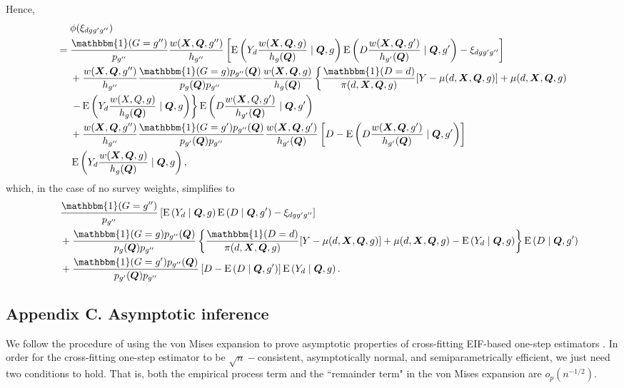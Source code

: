 \documentclass[12pt,a4paper]{article}
\newcommand{\E}{\operatorname{E}}
\def\X{{\boldsymbol X}}
\def\Q{{\boldsymbol Q}}
\def\one{\mathbbm{1}}
\begin{document}
Hence,
\begin{align*}
    &\phantom{{}={}} \phi(\xi_{dgg'g''}) \\
    &= \frac{\one(G=g'')}{p_{g''}}\frac{w(\X,\Q,g'')}{h_{g''}} \left[ \E \left(Y_d \frac{w(\X,\Q,g)}{h_{g}(\Q)}  \mid \Q, g \right) \E \left(D \frac{w(\X,\Q,g')}{h_{g'}(\Q)} \mid \Q, g' \right) - \xi_{dgg'g''} \right] \\
    &\phantom{{}={}} + \frac{w(\X,\Q,g'')}{h_{g''}}  \frac{\one(G=g) p_{g''}(\Q)}{p_g(\Q)p_{g''}} \frac{w(\X,\Q,g)}{h_g(\Q)} \left\{ \frac{\one(D=d)}{\pi(d,\X,\Q,g)} [Y-\mu(d,\X,\Q,g)]+\mu(d,\X,\Q,g) \right. \\
    &\phantom{{}={}} \left. - \E \left(Y_d \frac{w(X,Q,g)}{h_g(\Q)} \mid \Q,g \right) \right\} \E \left(D \frac{w(\X,Q,g')}{h_{g'}(\Q)} \mid \Q,g' \right) \\
    &\phantom{{}={}} + \frac{w(\X,\Q,g'')}{h_{g''}}  \frac{\one(G=g')p_{g''}(\Q)}{p_{g'}(\Q)p_{g''}} \frac{w(\X,\Q,g')}{h_{g'}(\Q)} \left[ D-\E \left(D \frac{w(\X,\Q,g')}{h_{g'}(\Q)} \mid \Q, g' \right) \right] \\
    &\phantom{{}={}} \E\left( Y_d \frac{w(\X,\Q,g)}{h_g(\Q)} \mid \Q, g \right), 
\end{align*}
which, in the case of no survey weights, simplifies to 
\begin{align*}
    &\phantom{{}={}} \frac{\one(G=g'')}{p_{g''}} \left[ \E \left(Y_d \mid \Q, g \right) \E \left(D \mid \Q, g' \right) - \xi_{dgg'g''} \right] \\
    &\phantom{{}={}} + \frac{\one(G=g) p_{g''}(\Q)}{p_g(\Q)p_{g''}} \left\{ \frac{\one(D=d)}{\pi(d,\X,\Q,g)} [Y-\mu(d,\X,\Q,g)]+\mu(d,\X,\Q,g) - \E \left(Y_d \mid \Q,g \right) \right\} \E \left(D \mid \Q,g' \right) \\
    &\phantom{{}={}} + \frac{\one(G=g')p_{g''}(\Q)}{p_{g'}(\Q)p_{g''}} \left[ D-\E \left(D \mid \Q, g' \right) \right] \E\left( Y_d \mid \Q, g \right).
\end{align*}

\subsection*{Appendix C. Asymptotic inference}

We follow the procedure of using the von Mises expansion to prove asymptotic properties of cross-fitting EIF-based one-step estimators \citep{hines_demystifying_2022, kennedy_semiparametric_2022, fisher_visually_2021}. In order for the cross-fitting one-step estimator to be  $\sqrt{n}-$consistent, asymptotically normal, and semiparametrically efficient, we just need two conditions to hold. That is, both the empirical process term and the ``remainder term" in the von Mises expansion are $o_p(n^{-1/2})$.
\end{document}
